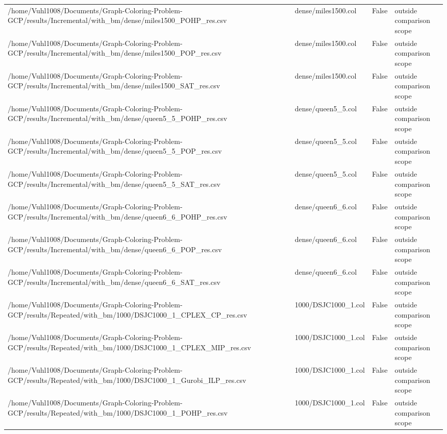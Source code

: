 \begin{table}[htbp]
\begin{tabular}{llll}
/home/Vuhl1008/Documents/Graph-Coloring-Problem-GCP/results/Incremental/with\_bm/dense/miles1500\_POHP\_res.csv & dense/miles1500.col & False & outside comparison scope \\
/home/Vuhl1008/Documents/Graph-Coloring-Problem-GCP/results/Incremental/with\_bm/dense/miles1500\_POP\_res.csv & dense/miles1500.col & False & outside comparison scope \\
/home/Vuhl1008/Documents/Graph-Coloring-Problem-GCP/results/Incremental/with\_bm/dense/miles1500\_SAT\_res.csv & dense/miles1500.col & False & outside comparison scope \\
/home/Vuhl1008/Documents/Graph-Coloring-Problem-GCP/results/Incremental/with\_bm/dense/queen5\_5\_POHP\_res.csv & dense/queen5\_5.col & False & outside comparison scope \\
/home/Vuhl1008/Documents/Graph-Coloring-Problem-GCP/results/Incremental/with\_bm/dense/queen5\_5\_POP\_res.csv & dense/queen5\_5.col & False & outside comparison scope \\
/home/Vuhl1008/Documents/Graph-Coloring-Problem-GCP/results/Incremental/with\_bm/dense/queen5\_5\_SAT\_res.csv & dense/queen5\_5.col & False & outside comparison scope \\
/home/Vuhl1008/Documents/Graph-Coloring-Problem-GCP/results/Incremental/with\_bm/dense/queen6\_6\_POHP\_res.csv & dense/queen6\_6.col & False & outside comparison scope \\
/home/Vuhl1008/Documents/Graph-Coloring-Problem-GCP/results/Incremental/with\_bm/dense/queen6\_6\_POP\_res.csv & dense/queen6\_6.col & False & outside comparison scope \\
/home/Vuhl1008/Documents/Graph-Coloring-Problem-GCP/results/Incremental/with\_bm/dense/queen6\_6\_SAT\_res.csv & dense/queen6\_6.col & False & outside comparison scope \\
/home/Vuhl1008/Documents/Graph-Coloring-Problem-GCP/results/Repeated/with\_bm/1000/DSJC1000\_1\_CPLEX\_CP\_res.csv & 1000/DSJC1000\_1.col & False & outside comparison scope \\
/home/Vuhl1008/Documents/Graph-Coloring-Problem-GCP/results/Repeated/with\_bm/1000/DSJC1000\_1\_CPLEX\_MIP\_res.csv & 1000/DSJC1000\_1.col & False & outside comparison scope \\
/home/Vuhl1008/Documents/Graph-Coloring-Problem-GCP/results/Repeated/with\_bm/1000/DSJC1000\_1\_Gurobi\_ILP\_res.csv & 1000/DSJC1000\_1.col & False & outside comparison scope \\
/home/Vuhl1008/Documents/Graph-Coloring-Problem-GCP/results/Repeated/with\_bm/1000/DSJC1000\_1\_POHP\_res.csv & 1000/DSJC1000\_1.col & False & outside comparison scope \\

\end{tabular}
\end{table}
